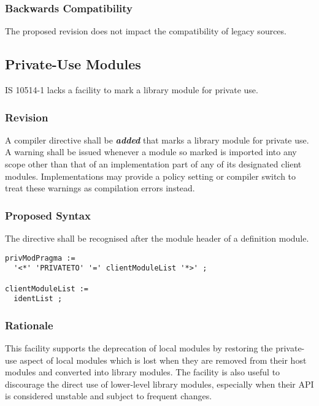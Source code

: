 \documentclass[10pt,a4paper,leqno,fleqn]{article}
\renewcommand{\emph}[1]{\textbf{\textit{#1}}}
\begin{document}
\subsubsection{Backwards Compatibility}

The proposed revision does not impact the compatibility of legacy sources.


\subsection{Private-Use Modules}
\label{PrivMod}

IS 10514-1 lacks a facility to mark a library module for private use.

\subsubsection{Revision}

A \gls{compiler directive} shall be \emph{added} that marks a library module
for private use. A warning shall be issued whenever a module so marked is
imported into any scope other than that of an implementation part of any of
its designated client modules. Implementations may provide a policy setting
or compiler switch to treat these warnings as compilation errors instead.

\subsubsection{Proposed Syntax}

The directive shall be recognised after the module header of a
definition module.

\begin{verbatim}
privModPragma :=
  '<*' 'PRIVATETO' '=' clientModuleList '*>' ;
  
clientModuleList :=
  identList ;
\end{verbatim}

\subsubsection{Rationale}

This facility supports the deprecation of local modules by restoring the
private-use aspect of local modules which is lost when they are removed
from their host modules and converted into library modules. The facility is
also useful to discourage the direct use of lower-level library modules,
especially when their \gls{API} is considered unstable and subject to
frequent changes.
\end{document}
